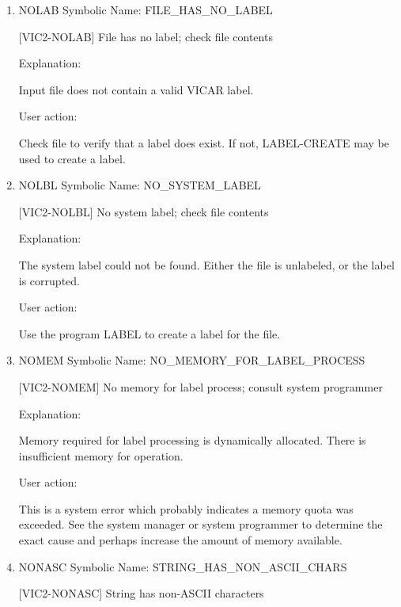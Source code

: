 \begin{enumerate}
 No such key in the indicated task

Explanation:

The indicated routine is unable to find the specified key in the
label.  This can be either a user or programmer error.

User action:

If the key is user specified, check the label to verify that the
label item exists.  If, after checking, the problem is not obvious,
consult the cognizant programmer.


\item NOLAB Symbolic Name: FILE\_HAS\_NO\_LABEL

[VIC2-NOLAB] File has no label; check file contents

Explanation:

Input file does not contain a valid VICAR label.

User action:

Check file to verify that a label does exist.  If not, LABEL-CREATE
may be used to create a label.


\item NOLBL Symbolic Name: NO\_SYSTEM\_LABEL

[VIC2-NOLBL] No system label; check file contents

Explanation:

The system label could not be found.  Either the file is
unlabeled, or the label is corrupted.

User action:

Use the program LABEL to create a label for the file.


\item NOMEM Symbolic Name: NO\_MEMORY\_FOR\_LABEL\_PROCESS

[VIC2-NOMEM] No memory for label process; consult system programmer

Explanation:

Memory required for label processing is dynamically allocated.
There is insufficient memory for operation.

User action:

This is a system error which probably indicates a memory quota
was exceeded.  See the system manager or system programmer to
determine the exact cause and perhaps increase the amount of
memory available.


\item NONASC Symbolic Name: STRING\_HAS\_NON\_ASCII\_CHARS

[VIC2-NONASC] String has non-ASCII characters


\end{enumerate}
